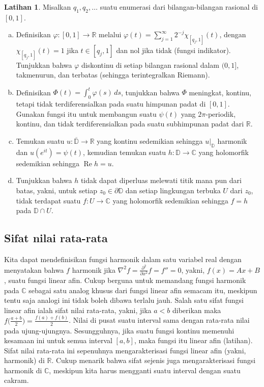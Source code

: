 \documentclass[12pt,openany]{book}
\renewcommand{\Re}{\operatorname{Re}}
\newcommand{\C}{{\mathbb{C}}}
\newcommand{\R}{{\mathbb{R}}}
\newcommand{\D}{{\mathbb{D}}}
\theoremstyle{plain}
\theoremstyle{remark}
\theoremstyle{definition}
\newenvironment{exbox}{%
    \def\FrameCommand{\vrule width 1pt \relax\hspace{10pt}}%
    \MakeFramed{\advance\hsize-\width\FrameRestore}%
}{%
    \endMakeFramed
}
\newenvironment{exparts}{%
    \leavevmode\begin{enumerate}[a),noitemsep,topsep=0pt,parsep=0pt,partopsep=0pt]
}{%
    \end{enumerate}
}
\theoremstyle{exercise}
\newtheorem{exercise}{Latihan}[section]
\theoremstyle{example}
\begin{document}
\begin{exbox}
\begin{exercise}
Misalkan $q_1,q_2,\ldots$ suatu enumerasi dari bilangan-bilangan
rasional di $[0,1]$.
\begin{exparts}
\item
Definisikan $\varphi \colon [0,1] \to {\mathbb R}$
melalui $\varphi(t) = \sum_{j=1}^\infty 2^{-j} \chi_{[q_j,1]}(t)$,
dengan $\chi_{[q_j,1]}(t) = 1$ jika $t \in [q_j,1]$ dan
nol jika tidak (fungsi indikator). Tunjukkan bahwa
$\varphi$ diskontinu di setiap bilangan rasional dalam $(0,1]$,
takmenurun, dan terbatas (sehingga terintegralkan Riemann).
\item
Definisikan $\Phi(t) = \int_0^t \varphi(s)\, ds$, tunjukkan bahwa $\Phi$
meningkat, kontinu, tetapi tidak terdiferensialkan
pada suatu himpunan padat di $[0,1]$. Gunakan fungsi itu untuk membangun suatu
$\psi(t)$ yang $2\pi$-periodik, kontinu, dan
tidak terdiferensialkan pada suatu subhimpunan padat dari $\R$.
\item
Temukan suatu $u \colon \overline{\D} \to \R$ yang kontinu
sedemikian sehingga $u|_{\D}$ harmonik dan
$u(e^{it}) = \psi(t)$, kemudian temukan suatu $h \colon \D \to \C$ yang holomorfik
sedemikian sehingga $\Re h = u$.
\item
Tunjukkan bahwa $h$ tidak dapat diperluas melewati titik mana pun dari
batas, yakni, untuk setiap
$z_0 \in \partial \D$ dan setiap lingkungan terbuka
$U$ dari $z_0$, tidak terdapat suatu $f \colon U \to \C$ yang holomorfik
sedemikian sehingga $f = h$ pada $\D \cap U$.
\end{exparts}
\end{exercise}
\end{exbox}

\subsection{Sifat nilai rata-rata}

Kita dapat mendefinisikan fungsi harmonik dalam satu variabel real
dengan menyatakan bahwa $f$ harmonik jika
$\nabla^2 f = \frac{\partial^2}{\partial x^2} f = f'' = 0$, yakni, $f(x) = Ax+B$, suatu fungsi
linear afin. Cukup berguna untuk memandang fungsi harmonik pada $\C$ sebagai satu
analog khusus dari fungsi linear afin semacam itu, meskipun tentu saja analogi ini
tidak boleh dibawa terlalu jauh.
Salah satu sifat fungsi linear afin ialah sifat nilai rata-rata, yakni,
jika $a < b$ diberikan maka $f\bigl(\frac{a+b}{2}\bigr) = \frac{f(a)+f(b)}{2}$. Nilai
di pusat suatu interval sama dengan rata-rata nilai pada
ujung-ujungnya. Sesungguhnya, jika suatu fungsi kontinu memenuhi kesamaan ini untuk semua
interval $[a,b]$, maka fungsi itu
linear afin (latihan). Sifat nilai rata-rata ini sepenuhnya mengarakterisasi fungsi
linear afin (yakni, harmonik) di $\R$.
Cukup menarik bahwa sifat sejenis juga mengarakterisasi
fungsi harmonik di $\C$, meskipun kita harus mengganti suatu interval
dengan suatu cakram.
\end{document}
